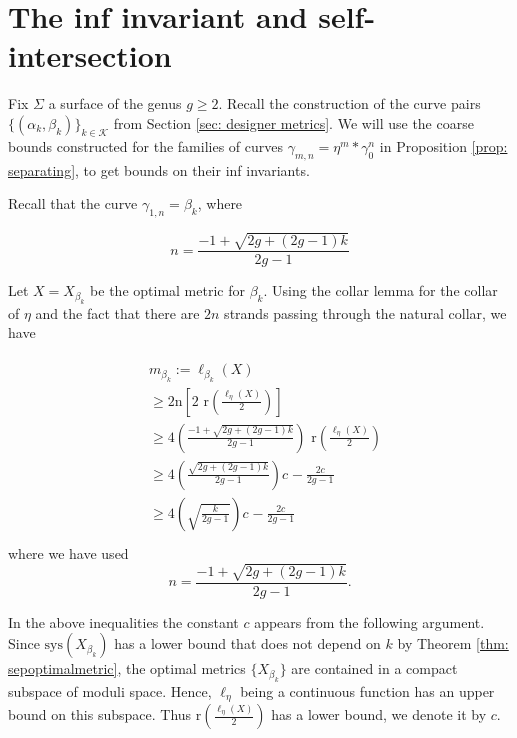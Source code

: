 \documentclass[12pt]{amsart}
\numberwithin{equation}{section}
\theoremstyle{plain}
\begin{document}
\section{The inf  invariant and self-intersection}
\label{sec: the inf invariant and self-}

Fix $\Sigma$ a surface of the genus $g \geq 2$. Recall the construction of  the curve pairs $\{(\alpha_{k},\beta_{k})\}_{k \in \mathcal{K}}$ from Section \ref{sec: designer metrics}.
 We will use the coarse bounds constructed for the families of curves $\gamma_{m,n} =\eta^{m}\ast\gamma_{0}^{n}$  in Proposition \ref{prop: separating}, to get bounds on their inf invariants.  

\vskip10pt
  Recall that the curve $\gamma_{1,n} = \beta_{k}$, where

$$n =\frac{-1 + \sqrt{2g + (2g -1)k}}{2g-1}$$

Let $X = X_{\beta_k}$ be the optimal metric for $\beta_k$.
Using the collar lemma for the collar of $\eta$ and the fact that there are $2n$ strands passing through the natural collar, we have

\begin{align}\label{eq: mbeta}
\begin{split}
& m_{\beta_{k}}:= \ell_{\beta_{k}}(X) \\
&\geq  2\text{n} \left[2\text{ r}\left(\frac{\ell_{\eta}(X)}{2}\right)\right] \\
&\geq  4\left( \frac{-1 + \sqrt{2g + (2g -1)k}}{2g-1} \right)\text{ r}\left(\frac{\ell_{\eta}(X)}{2}\right)\\
&\geq 4 \left(\frac{\sqrt{2g + (2g -1)k}}{2g-1} \right)c_{} - \frac{2c}{2g -1}\\
&\geq 4 \left(\sqrt{\frac{k}{2g-1}} \right)c_{}  - \frac{2c}{2g -1}\\
\end{split}
\end{align}
  where we have used $$n= \frac{-1 + \sqrt{2g + (2g -1)k}}{2g-1} .$$ 

   In the above inequalities the constant $c$ appears from the following argument. Since $\text{sys}(X_{\beta_{k}})$ has a lower bound that does not depend on $k$ by Theorem \ref{thm: sepoptimalmetric}, the optimal metrics $\{X_{\beta_{k}}\}$ are contained in a compact subspace of moduli space. Hence, $\ell_{\eta}$ being a continuous function has an upper bound on this subspace. Thus 
 $\text{r}\left(\frac{\ell_{\eta}(X)}{2}\right)$ has a lower bound, we denote it by ${c}$. 
  
\end{document}
